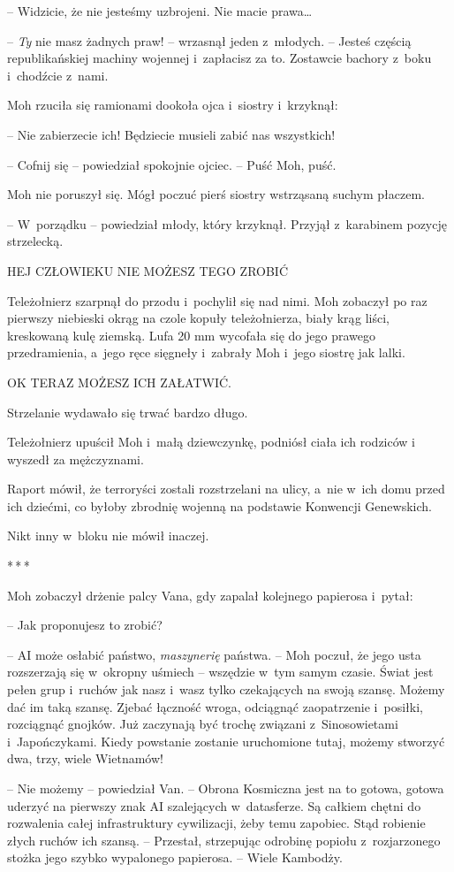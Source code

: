 \documentclass[oneside,polish,11pt,sfheadings]{mwbk}
\newcommand{\threeast}{\bigskip\par\centerline{*\,*\,*}\medskip\par}%
\begin{document}
-- Widzicie, że nie jesteśmy uzbrojeni. Nie macie
prawa\ldots

-- \emph{Ty }nie masz żadnych praw! -- wrzasnął jeden z~młodych. -- Jesteś
częścią republikańskiej machiny wojennej i~zapłacisz za to. Zostawcie
bachory z~boku i~chodźcie z~nami.

Moh rzuciła się ramionami dookoła ojca i~siostry i~krzyknął: 

-- Nie
zabierzecie ich! Będziecie musieli zabić nas wszystkich!

-- Cofnij się -- powiedział spokojnie ojciec. -- Puść Moh, puść.

Moh nie poruszył się. Mógł poczuć pierś siostry wstrząsaną suchym
płaczem.

-- W~porządku -- powiedział młody, który krzyknął. Przyjął z~karabinem
pozycję strzelecką.

HEJ CZŁOWIEKU NIE MOŻESZ TEGO ZROBIĆ

Teleżołnierz szarpnął do przodu i~pochylił się nad nimi. Moh zobaczył po
raz pierwszy niebieski okrąg na czole kopuły teleżołnierza, biały krąg
liści, kreskowaną kulę ziemską. Lufa 20 mm wycofała się do jego prawego
przedramienia, a~jego ręce sięgneły i~zabrały Moh i~jego siostrę jak
lalki.

OK TERAZ MOŻESZ ICH ZAŁATWIĆ.

Strzelanie wydawało się trwać bardzo długo.

Teleżołnierz upuścił Moh i~małą dziewczynkę, podniósł ciała ich rodziców
i wyszedł za mężczyznami.

Raport mówił, że terroryści zostali rozstrzelani na ulicy, a~nie w~ich
domu przed ich dziećmi, co byłoby zbrodnię wojenną na podstawie
Konwencji Genewskich.

Nikt inny w~bloku nie mówił inaczej.
  \threeast 

Moh zobaczył drżenie palcy Vana, gdy zapalał kolejnego papierosa i~pytał: 

-- Jak proponujesz to zrobić?

-- AI może osłabić państwo, \emph{maszynerię} państwa. -- Moh poczuł, że
jego usta rozszerzają się w~okropny uśmiech -- wszędzie w~tym samym
czasie. Świat jest pełen grup i~ruchów jak nasz i~wasz tylko czekających
na swoją szansę. Możemy dać im taką szansę. Zjebać łączność wroga,
odciągnąć zaopatrzenie i~posiłki, rozciągnąć gnojków. Już zaczynają być
trochę związani z~Sinosowietami i~Japończykami. Kiedy powstanie zostanie
uruchomione tutaj, możemy stworzyć dwa, trzy, wiele Wietnamów!

-- Nie możemy -- powiedział Van. -- Obrona Kosmiczna jest na to gotowa,
gotowa uderzyć na pierwszy znak AI szalejących w~datasferze. Są całkiem
chętni do rozwalenia całej infrastruktury cywilizacji, żeby temu
zapobiec. Stąd robienie złych ruchów ich szansą. -- Przestał, strzepując
odrobinę popiołu z~rozjarzonego stożka jego szybko wypalonego papierosa.
-- Wiele Kambodży.
\end{document}
